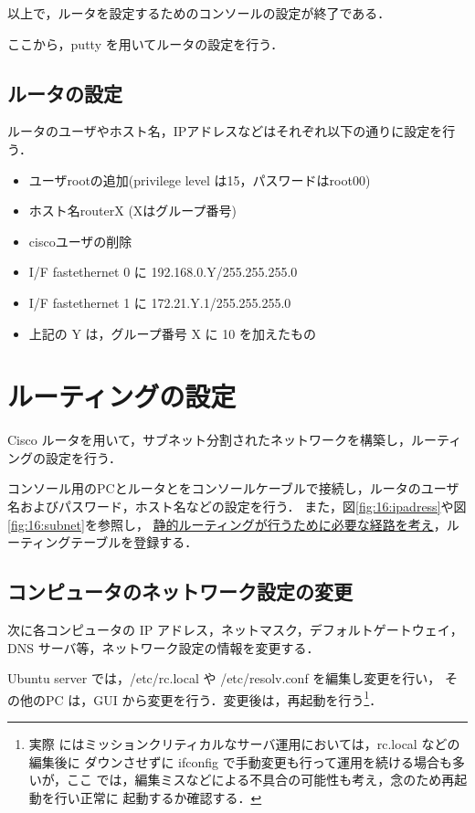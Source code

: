 以上で，ルータを設定するためのコンソールの設定が終了である．

ここから，putty を用いてルータの設定を行う．

\subsection{ルータの設定}
ルータのユーザやホスト名，IPアドレスなどはそれぞれ以下の通りに設定を行う．
\begin{itemize}
\item ユーザrootの追加(privilege level は15，パスワードはroot00)
\item ホスト名routerX (Xはグループ番号)
\item ciscoユーザの削除
\item I/F fastethernet 0 に 192.168.0.Y/255.255.255.0
\item I/F fastethernet 1 に 172.21.Y.1/255.255.255.0
 \item 上記の Y は，グループ番号 X に 10 を加えたもの
\end{itemize}

\section{ルーティングの設定}
Cisco ルータを用いて，サブネット分割されたネットワークを構築し，ルーティングの設定を行う．

コンソール用のPCとルータとをコンソールケーブルで接続し，ルータのユーザ名およびパスワード，ホスト名などの設定を行う．
また，図\ref{fig:16:ipadress}や図\ref{fig:16:subnet}を参照し，
\underline{静的ルーティングが行うために必要な経路を考え}，ルーティングテーブルを登録する．

\subsection{コンピュータのネットワーク設定の変更}

次に各コンピュータの IP アドレス，ネットマスク，デフォルトゲートウェイ，
DNS サーバ等，ネットワーク設定の情報を変更する．

Ubuntu server では，/etc/rc.local や /etc/resolv.conf を編集し変更を行い，
その他のPC は，GUI から変更を行う．変更後は，再起動を行う\footnote{実際
にはミッションクリティカルなサーバ運用においては，rc.local などの編集後に
ダウンさせずに ifconfig で手動変更も行って運用を続ける場合も多いが，ここ
では，編集ミスなどによる不具合の可能性も考え，念のため再起動を行い正常に
起動するか確認する．}．

